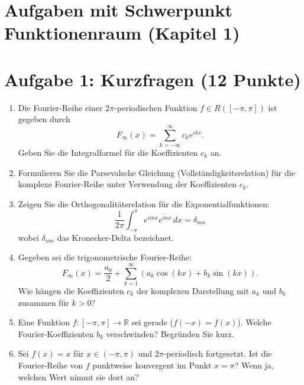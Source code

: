 \newpage
\section{Aufgaben mit Schwerpunkt Funktionenraum (Kapitel 1)}

\section*{Aufgabe 1: Kurzfragen (12 Punkte)}

\begin{enumerate}[label=\arabic*.]
    \item Die Fourier-Reihe einer $2\pi$-periodischen Funktion $f \in R([-\pi, \pi])$ ist gegeben durch
    \[
        F_\infty(x) = \sum_{k=-\infty}^{\infty} c_k e^{ikx}.
    \]
    Geben Sie die Integralformel für die Koeffizienten $c_k$ an.
    \vspace{0.2cm}
    
    \item Formulieren Sie die Parsevalsche Gleichung (Vollständigkeitsrelation) für die komplexe Fourier-Reihe unter Verwendung der Koeffizienten $c_k$.
    \vspace{0.2cm}
    
    \item Zeigen Sie die Orthogonalitätsrelation für die Exponentialfunktionen:
    \[
        \frac{1}{2\pi} \int_{-\pi}^{\pi} e^{imx} \overline{e^{inx}} \, dx = \delta_{mn}
    \]
    wobei $\delta_{mn}$ das Kronecker-Delta bezeichnet.
    \vspace{0.2cm}
    
    \item Gegeben sei die trigonometrische Fourier-Reihe:
    \[
        F_\infty(x) = \frac{a_0}{2} + \sum_{k=1}^{\infty} \left( a_k \cos(kx) + b_k \sin(kx) \right).
    \]
    Wie hängen die Koeffizienten $c_k$ der komplexen Darstellung mit $a_k$ und $b_k$ zusammen für $k > 0$?
    \vspace{0.2cm}
    
    \item Eine Funktion $f: [-\pi, \pi] \to \mathbb{R}$ sei gerade ($f(-x) = f(x)$). Welche Fourier-Koeffizienten $b_k$ verschwinden? Begründen Sie kurz.
    \vspace{0.2cm}
    
    \item Sei $f(x) = x$ für $x \in (-\pi, \pi)$ und $2\pi$-periodisch fortgesetzt. Ist die Fourier-Reihe von $f$ punktweise konvergent im Punkt $x = \pi$? Wenn ja, welchen Wert nimmt sie dort an?
    \vspace{0.2cm}
    

\end{enumerate}
